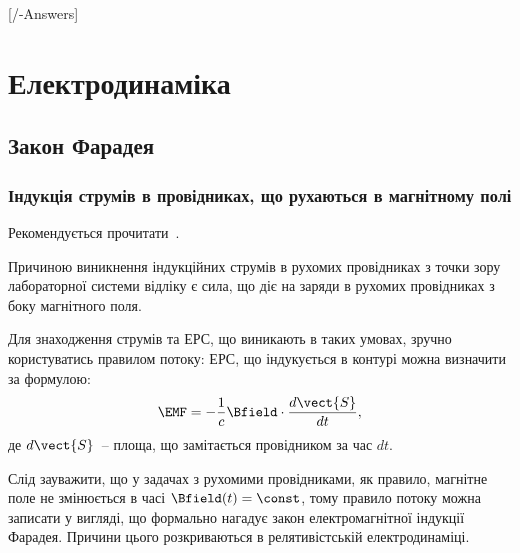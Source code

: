 
[\currfilebase/\currfilebase-Answers]
\chapter{Електродинаміка}\label{\currfilebase}

\section{Закон Фарадея}



\subsection*{Індукція струмів в провідниках, що рухаються в магнітному полі}

\begin{Theory}\small
	Рекомендується прочитати~\cite[Глава 16, 17]{FLF6}.
	
	Причиною виникнення індукційних струмів в рухомих провідниках з точки зору лабораторної системи відліку є сила, що діє на заряди в рухомих провідниках з боку магнітного поля. 

	Для знаходження струмів та ЕРС, що виникають в таких умовах, зручно користуватись правилом потоку: ЕРС, що індукується в контурі можна визначити за формулою: 	
	\begin{equation}
		\EMF = - \frac1c \Bfield \cdot \frac{d\vect{S}}{dt},
	\end{equation} 
де $d\vect{S}$~-- площа, що замітається провідником за час $dt$.
\begin{Attention}
	Слід зауважити, що у задачах з рухомими провідниками, як правило, магнітне поле не змінюється в часі $\Bfield(t) = \const$, тому правило потоку можна записати у вигляді, що формально нагадує закон електромагнітної індукції Фарадея. Причини цього розкриваються в релятивістській електродинаміці.
\end{Attention}
\end{Theory}

